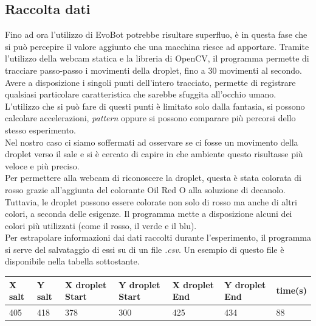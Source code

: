 \subsection{Raccolta dati}
Fino ad ora l'utilizzo di EvoBot potrebbe risultare superfluo, è in questa fase che si può percepire il valore aggiunto che una macchina riesce ad apportare. Tramite l'utilizzo della webcam statica e la libreria di OpenCV, il programma permette di tracciare passo-passo i movimenti della droplet, fino a 30 movimenti al secondo. Avere a disposizione i singoli punti dell'intero tracciato, permette di registrare qualsiasi particolare caratteristica che sarebbe sfuggita all'occhio umano. L'utilizzo che si  può fare di questi punti è limitato solo dalla fantasia, si possono calcolare accelerazioni, \emph{pattern} oppure si possono comparare più percorsi dello stesso esperimento.
\\Nel nostro caso ci siamo soffermati ad osservare se ci fosse un movimento della droplet verso il sale e si è cercato di capire in che ambiente questo risultasse più veloce e più preciso.
\\Per permettere alla webcam di riconoscere la droplet, questa è stata colorata di rosso grazie all'aggiunta del colorante Oil Red O alla soluzione di decanolo. Tuttavia, le droplet possono essere colorate non solo di rosso ma anche di altri colori, a seconda delle esigenze. Il programma mette a disposizione alcuni dei colori più utilizzati (come il rosso, il verde e il blu). 
\\ Per estrapolare informazioni dai dati raccolti durante l'esperimento, il programma si serve del salvataggio di essi su di un file \emph{.csv}.
Un esempio di questo file è disponibile nella tabella sottostante. 

\begin{center}
\begin{tabular}{lllllll}
X salt & Y salt & X droplet Start & Y droplet Start & X droplet End & Y droplet End & time(s) \\
\hline
405    & 418    & 378             & 300             & 425           & 434           & 88  
\end{tabular}
\end{center}


